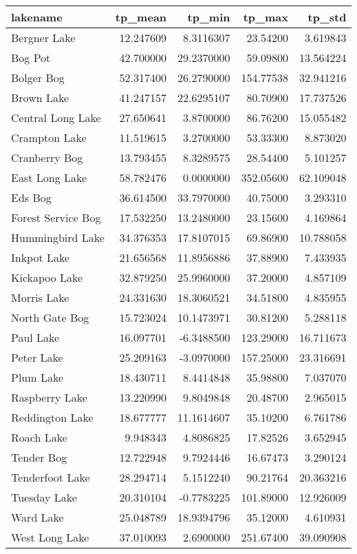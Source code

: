 \documentclass[]{article}
\begin{document}
\begin{tabular}{l|r|r|r|r}
\hline
lakename & tp\_mean & tp\_min & tp\_max & tp\_std\\
\hline
Bergner Lake & 12.247609 & 8.3116307 & 23.54200 & 3.619843\\
\hline
Bog Pot & 42.700000 & 29.2370000 & 59.09800 & 13.564224\\
\hline
Bolger Bog & 52.317400 & 26.2790000 & 154.77538 & 32.941216\\
\hline
Brown Lake & 41.247157 & 22.6295107 & 80.70900 & 17.737526\\
\hline
Central Long Lake & 27.650641 & 3.8700000 & 86.76200 & 15.055482\\
\hline
Crampton Lake & 11.519615 & 3.2700000 & 53.33300 & 8.873020\\
\hline
Cranberry Bog & 13.793455 & 8.3289575 & 28.54400 & 5.101257\\
\hline
East Long Lake & 58.782476 & 0.0000000 & 352.05600 & 62.109048\\
\hline
Eds Bog & 36.614500 & 33.7970000 & 40.75000 & 3.293310\\
\hline
Forest Service Bog & 17.532250 & 13.2480000 & 23.15600 & 4.169864\\
\hline
Hummingbird Lake & 34.376353 & 17.8107015 & 69.86900 & 10.788058\\
\hline
Inkpot Lake & 21.656568 & 11.8956886 & 37.88900 & 7.433935\\
\hline
Kickapoo Lake & 32.879250 & 25.9960000 & 37.20000 & 4.857109\\
\hline
Morris Lake & 24.331630 & 18.3060521 & 34.51800 & 4.835955\\
\hline
North Gate Bog & 15.723024 & 10.1473971 & 30.81200 & 5.288118\\
\hline
Paul Lake & 16.097701 & -6.3488500 & 123.29000 & 16.711673\\
\hline
Peter Lake & 25.209163 & -3.0970000 & 157.25000 & 23.316691\\
\hline
Plum Lake & 18.430711 & 8.4414848 & 35.98800 & 7.037070\\
\hline
Raspberry Lake & 13.220990 & 9.8049848 & 20.48700 & 2.965015\\
\hline
Reddington Lake & 18.677777 & 11.1614607 & 35.10200 & 6.761786\\
\hline
Roach Lake & 9.948343 & 4.8086825 & 17.82526 & 3.652945\\
\hline
Tender Bog & 12.722948 & 9.7924446 & 16.67473 & 3.290124\\
\hline
Tenderfoot Lake & 28.294714 & 5.1512240 & 90.21764 & 20.363216\\
\hline
Tuesday Lake & 20.310104 & -0.7783225 & 101.89000 & 12.926009\\
\hline
Ward Lake & 25.048789 & 18.9394796 & 35.12000 & 4.610931\\
\hline
West Long Lake & 37.010093 & 2.6900000 & 251.67400 & 39.090908\\
\hline
\end{tabular}
\end{document}
